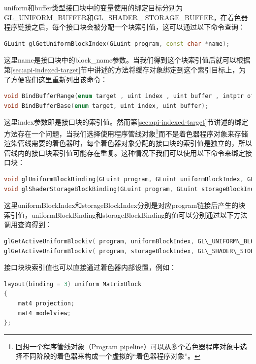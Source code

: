 uniform和buffer类型接口块中的变量使用的绑定目标分别为GL\_UNIFORM\_BUFFER和GL\_SHADER\_ STORAGE\_BUFFER，在着色器程序链接之后，每个接口块会被分配一个块索引值，这可以通过以下命令查询：

\begin{lstlisting}[language=C++]
GLuint glGetUniformBlockIndex​(GLuint program​​, const char *name​​);
\end{lstlisting}

这里name是接口块中的block\_name参数。当我们得到这个块索引值后就可以根据第\ref{sec:api-indexed-target}节中讲述的方法将缓存对象绑定到这个索引目标上，为了方便我们这里重新列出该命令：

\begin{lstlisting}[language=C++]
void BindBufferRange(enum target , uint index , uint buffer , intptr offset , sizeiptr size);
void BindBufferBase(enum target, uint index, uint buffer);
\end{lstlisting}

这里index参数即是接口块的索引值。然而第\ref{sec:api-indexed-target}节讲述的绑定方法存在一个问题，当我们选择使用程序管线对象\footnote{回想一个程序管线对象（Program pipeline）可以从多个着色器程序对象中选择不同阶段的着色器来构成一个虚拟的“着色器程序对象”。}而不是着色器程序对象来存储渲染管线需要的着色器时，每个着色器对象分配的接口块的索引值是独立的，所以管线内的接口块索引值可能存在重复。这种情况下我们可以使用以下命令来绑定接口块：

\begin{lstlisting}[language=C++]
void glUniformBlockBinding​(GLuint program​​, GLuint uniformBlockIndex​​, GLuint uniformBlockBinding​​);
void glShaderStorageBlockBinding​(GLuint program​​, GLuint storageBlockIndex​​, GLuint storageBlockBinding​​);
\end{lstlisting}

这里uniformBlockIndex和storageBlockIndex分别是对应program链接后产生的块索引值，uniformBlockBinding和storageBlockBinding的值可以分别通过以下方法调用查询得到：

\begin{lstlisting}[language=C++]
glGetActiveUniformBlockiv( program, uniformBlockIndex, GL\_UNIFORM\_BLOCK\_BINDING, &uniformBlockBinding );
glGetActiveUniformBlockiv( program, storageBlockIndex, GL\_SHADER\_STORAGE\_BINDING, &storageBlockBinding );
\end{lstlisting}

接口块块索引值也可以直接通过着色器内部设置，例如：

\begin{lstlisting}[language=C++]
layout(binding = 3) uniform MatrixBlock
{
	mat4 projection;
	mat4 modelview;
};
\end{lstlisting}

